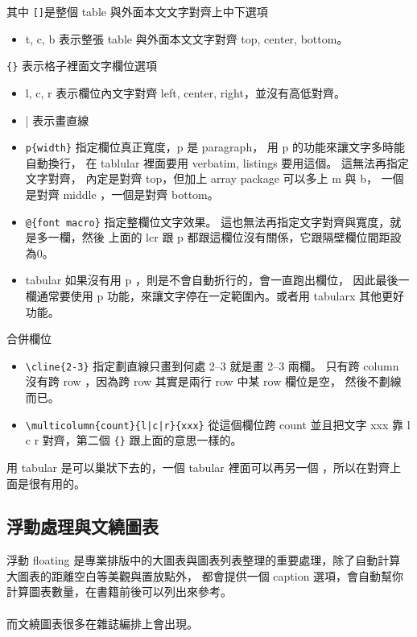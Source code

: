 其中 \verb=[]=是整個 table 與外面本文文字對齊上中下選項
\begin{itemize}
\item t, c, b 表示整張 table 與外面本文文字對齊 top, center, bottom。
\end{itemize}
\verb={}= 表示格子裡面文字欄位選項
\begin{itemize}
\item l, c, r 表示欄位內文字對齊 left, center, right，並沒有高低對齊。
\item | 表示畫直線
\item \verb=p{width}= 指定欄位真正寬度，p 是 paragraph，
用 p 的功能來讓文字多時能自動換行， 在 tablular 裡面要用 verbatim, 
listings 要用這個。 這無法再指定文字對齊，
內定是對齊 top，但加上 array package 可以多上 m 與 b，
一個是對齊 middle ，一個是對齊 bottom。
\item \verb=@{font macro}= 指定整欄位文字效果。
這也無法再指定文字對齊與寬度，就是多一欄，然後
上面的 lcr 跟 p 都跟這欄位沒有關係，它跟隔壁欄位間距設為0。
\item tabular 如果沒有用 p ，則是不會自動折行的，會一直跑出欄位，
因此最後一欄通常要使用 p 功能，來讓文字停在一定範圍內。或者用
tabularx 其他更好功能。
\end{itemize}
合併欄位
\begin{itemize}
\item \verb=\cline{2-3}= 指定劃直線只畫到何處 2--3 就是畫 2--3 兩欄。
只有跨 column 沒有跨 row ，因為跨 row 其實是兩行 row 中某 row 欄位是空，
然後不劃線而已。
\item \verb=\multicolumn{count}{l|c|r}{xxx}= 從這個欄位跨 count 並且把文字 xxx 靠
l c r 對齊，第二個 \verb={}= 跟上面的意思一樣的。
\end{itemize}
用 tabular 是可以巢狀下去的，一個 tabular 裡面可以再另一個
，所以在對齊上面是很有用的。
\subsection{浮動處理與文繞圖表}
浮動 floating 是專業排版中的大圖表與圖表列表整理的重要處理，除了自動計算
大圖表的距離空白等美觀與置放點外， 都會提供一個
caption 選項，會自動幫你計算圖表數量，在書籍前後可以列出來參考。
\\\\
而文繞圖表很多在雜誌編排上會出現。
